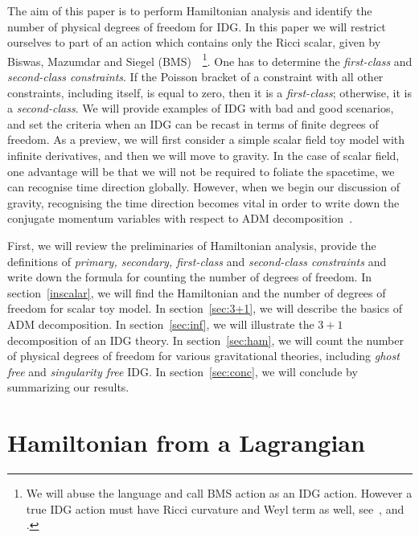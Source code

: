 \documentclass[a4paper,12pt]{article}
\newcommand{\+}{^{\dagger}}
\newcommand{\2}{\frac{1}{2}}
\newcommand{\3}{\frac{1}{3}}
\newcommand{\4}{\frac{1}{4}}
\newcommand{\6}{\frac{1}{6}}
\newcommand{\8}{\frac{1}{8}}
\begin{document}
The aim of this paper is to perform Hamiltonian analysis and identify the number of physical degrees of freedom for IDG.  
In this paper we will restrict ourselves to part of an action 
which contains only the Ricci scalar, given by  Biswas, Mazumdar and Siegel (BMS)~\cite{Biswas:2005qr}~\footnote{We will abuse the language
and call BMS action as an IDG action. However a true IDG action must have Ricci curvature and Weyl term as well, see~\cite{Biswas:2011ar,Biswas:2013kla}, and \cite{Biswas:2016etb,Biswas:2016egy}.}.
One has to determine the {\it first-class} and {\it second-class constraints}. If the Poisson bracket of a constraint with all other constraints, including itself, is equal to zero, then 
it is a {\it first-class}; otherwise, it is a {\it second-class}. We will provide examples of IDG with bad and good scenarios,  and set the criteria when an IDG can be recast in terms of finite degrees of freedom. 
As a preview, we will first consider a simple scalar field toy model with infinite derivatives, and then we will move to gravity. In the case of scalar field, one advantage will be that we will not be required to foliate the spacetime, we can recognise time direction globally.  However, when we begin our discussion of  gravity, recognising the time direction becomes vital in order to write down the conjugate momentum variables with
respect to ADM decomposition~\cite{Arnowitt:1962hi}. 

First, we will review the preliminaries of Hamiltonian analysis, provide the definitions of {\it primary, secondary, first-class} and {\it second-class constraints} and write down the formula for counting the number of degrees of freedom. In section~\ref{inscalar}, we will find the Hamiltonian and the number of degrees of freedom for scalar toy model. In section~\ref{sec:3+1}, we will describe the basics of ADM decomposition.
In section~\ref{sec:inf}, we  will illustrate the $3+1$ decomposition of an IDG theory. In section~\ref{sec:ham}, we will count the number of physical degrees of freedom for various gravitational theories, including {\it ghost free} and {\it singularity free} IDG. In section~\ref{sec:conc}, we will conclude by summarizing our results.


\section{Hamiltonian from a Lagrangian}
\end{document}
